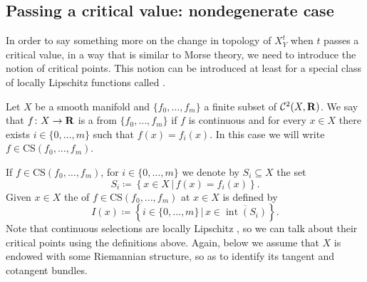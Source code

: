 \subsection{Passing a critical value: nondegenerate case}

In order to say something more on the change in topology  of $X_Y^t$ when $t$ passes a critical value, in a way that is similar to Morse theory, we need to introduce the notion of  critical points.
This notion can be introduced at least for a special class of locally Lipschitz functions called .

\begin{definition}
  Let $X$ be a smooth manifold and $\{f_0, \ldots, f_m\}$ a finite subset of $\mathcal{C}^2(X, \mathbf{R})$. We say that $f \colon X\to \mathbf{R}$ is a  from $\{f_0, \ldots, f_m\}$ if $f$ is continuous and for every $x\in X$ there exists $i\in \{0, \ldots, m\}$ such that $f(x)=f_i(x).$
  In this case we will write $f\in \mathrm{CS}(f_0, \ldots, f_m)$.
\end{definition}

If $f\in \mathrm{CS}(f_0, \ldots, f_m)$, for $i\in \{0, \ldots, m\}$ we denote by $S_i\subseteq X$  the set
\[
  S_i\coloneq\left\{x\in X\,\bigg|\, f(x)=f_i(x)\right\}.
\]
Given $x\in X$ the  of $f\in \mathrm{CS}(f_0, \ldots, f_m)$ at $x\in X$ is defined by
\[
  I(x)\coloneq\left\{i\in \{0, \ldots, m\}\,\bigg|\, x\in \overline{\operatorname{int}(S_i)}\right\}.
\]
Note that continuous selections are locally Lipschitz \cite{APS1997}, so we can talk about their critical points using the definitions above. Again, below we assume that $X$ is endowed with some Riemannian structure, so as to identify its tangent and cotangent bundles.

